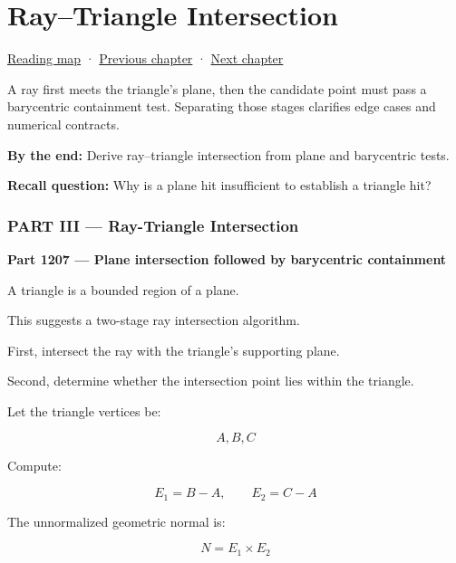 \chapter{Ray--Triangle Intersection}\label{04-visual-computing-ii-ch024-raytriangle-intersection}\hypertarget{04-visual-computing-ii-ch024}{}\label{stagechapter:04-visual-computing-ii-ch024}

\hypertarget{04-visual-computing-ii-ch024-raytriangle-intersection}{}

\hyperref[volume-reading-map]{Reading map} · \hyperref[04-visual-computing-ii-ch023-mesh-topology-and-connectivity]{Previous chapter} · \hyperref[04-visual-computing-ii-ch025-sat-for-triangle-and-convex-polygon-tests]{Next chapter}

A ray first meets the triangle's plane, then the candidate point must pass a barycentric containment test. Separating those stages clarifies edge cases and numerical contracts.

\textbf{By the end:} Derive ray--triangle intersection from plane and barycentric tests.

\textbf{Recall question:} Why is a plane hit insufficient to establish a triangle hit?

\subsection{PART III --- Ray-Triangle Intersection}\label{04-visual-computing-ii-ch024-part-iii-ray-triangle-intersection}

\hypertarget{04-visual-computing-ii-ch024-part-iii-ray-triangle-intersection}{}

\textbf{Part 1207 --- Plane intersection followed by barycentric containment}

A triangle is a bounded region of a plane.

This suggests a two-stage ray intersection algorithm.

First, intersect the ray with the triangle's supporting plane.

Second, determine whether the intersection point lies within the triangle.

Let the triangle vertices be:

\[
A,B,C
\]

Compute:

\[
E_1=B-A,\qquad E_2=C-A
\]

The unnormalized geometric normal is:

\[
N=E_1\times E_2
\]

